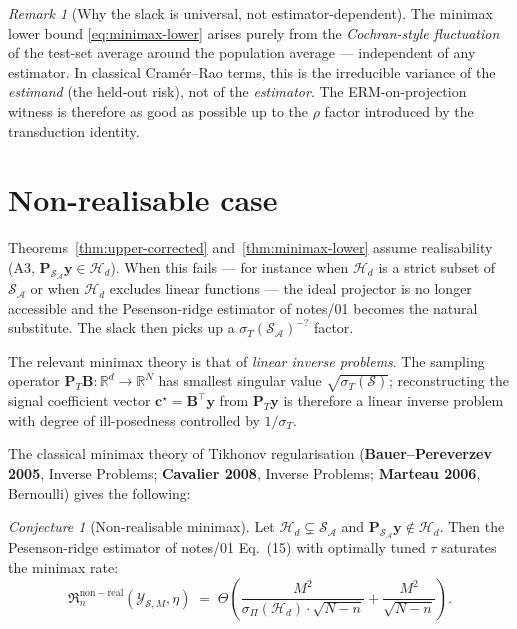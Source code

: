 \documentclass[11pt,a4paper]{article}
\theoremstyle{plain}
\theoremstyle{definition}
\theoremstyle{remark}
\newtheorem{remark}[theorem]{Remark}
\newtheorem{conjecture}[theorem]{Conjecture}
\newcommand{\by}{\mathbf{y}}
\newcommand{\bP}{\mathbf{P}}
\newcommand{\bB}{\mathbf{B}}
\newcommand{\bc}{\mathbf{c}}
\newcommand{\R}{\mathbb{R}}
\newcommand{\Scal}{\mathcal{S}}
\newcommand{\Acal}{\mathcal{A}}
\newcommand{\Hcal}{\mathcal{H}}
\newcommand{\Ycal}{\mathcal{Y}}
\newcommand{\frR}{\mathfrak{R}}
\begin{document}
\begin{remark}[Why the slack is universal, not estimator-dependent]
\label{rem:universal-slack}
The minimax lower bound \eqref{eq:minimax-lower} arises purely from the
\emph{Cochran-style fluctuation} of the test-set average around the
population average — independent of any estimator.  In classical
Cram\'er--Rao terms, this is the irreducible variance of the
\emph{estimand} (the held-out risk), not of the \emph{estimator}.  The
ERM-on-projection witness is therefore as good as possible up to the
$\rho$ factor introduced by the transduction identity.
\end{remark}

\section{Non-realisable case}
\label{sec:non-realisable}

Theorems~\ref{thm:upper-corrected} and~\ref{thm:minimax-lower} assume
realisability (A3, $\bP_{\Scal_\Acal}\by \in \Hcal_d$).  When this
fails — for instance when $\Hcal_d$ is a strict subset of $\Scal_\Acal$
or when $\Hcal_d$ excludes linear functions — the ideal projector is
no longer accessible and the Pesenson-ridge estimator of notes/01
becomes the natural substitute.  The slack then picks up a
$\sigma_T(\Scal_\Acal)^{-?}$ factor.

The relevant minimax theory is that of \emph{linear inverse problems}.
The sampling operator $\bP_T \bB : \R^d \to \R^N$ has smallest singular
value $\sqrt{\sigma_T(\Scal)}$; reconstructing the signal coefficient
vector $\bc^\star = \bB^\top \by$ from $\bP_T \by$ is therefore a
linear inverse problem with degree of ill-posedness controlled by
$1/\sigma_T$.

The classical minimax theory of Tikhonov regularisation
(\textbf{Bauer--Pereverzev 2005}, Inverse Problems; \textbf{Cavalier
2008}, Inverse Problems; \textbf{Marteau 2006}, Bernoulli) gives the
following:

\begin{conjecture}[Non-realisable minimax]
\label{conj:non-realisable}
Let $\Hcal_d \subsetneq \Scal_\Acal$ and $\bP_{\Scal_\Acal}\by \notin
\Hcal_d$.  Then the Pesenson-ridge estimator of notes/01 Eq.~(15)
with optimally tuned $\tau$ saturates the minimax rate:
\begin{equation}
    \frR_n^{\mathrm{non-real}}(\Ycal_{\Scal,M}, \eta)
    \;=\; \Theta\!\left(\frac{M^2}{\sigma_\Pi(\Hcal_d) \cdot \sqrt{N-n}}
        + \frac{M^2}{\sqrt{N-n}}\right).
\end{equation}
\end{conjecture}
\end{document}

